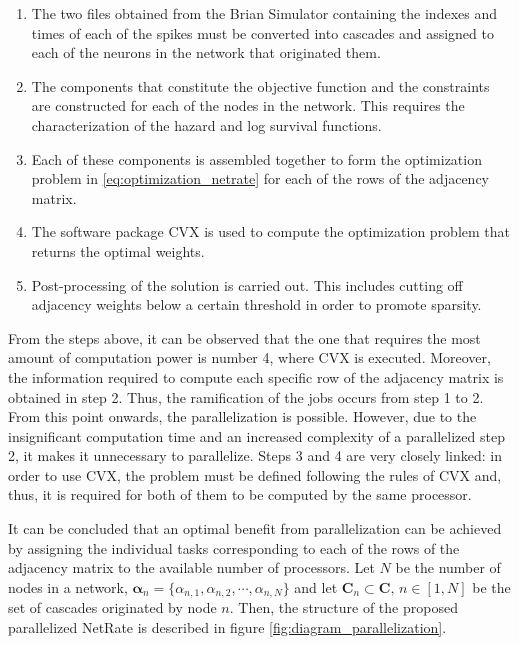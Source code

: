 \documentclass[11pt]{article}
\begin{document}
\begin{enumerate}
\item The two files obtained from the Brian Simulator containing the indexes and times of each of the spikes must be converted into cascades and assigned to each of the neurons in the network that originated them.
\item The components that constitute the objective function and the constraints are constructed for each of the nodes in the network. This requires the characterization of the hazard and log survival functions.
\item Each of these components is assembled together to form the optimization problem in \ref{eq:optimization_netrate} for each of the rows of the adjacency matrix.
\item The software package CVX is used to compute the optimization problem that returns the optimal weights.
\item Post-processing of the solution is carried out. This includes cutting off adjacency weights below a certain threshold in order to promote sparsity.
\end{enumerate}

From the steps above, it can be observed that the one that requires the most amount of computation power is number 4, where CVX is executed. Moreover, the information required to compute each specific row of the adjacency matrix is obtained in step 2. Thus, the ramification of the jobs occurs from step 1 to 2. From this point onwards, the parallelization is possible. However, due to the insignificant computation time and an increased complexity of a parallelized step 2, it makes it unnecessary to parallelize. 
Steps 3 and 4 are very closely linked: in order to use CVX, the problem must be defined following the rules of CVX and, thus, it is required for both of them to be computed by the same processor.

It can be concluded that an optimal benefit from parallelization can be achieved by assigning the individual tasks corresponding to each of the rows of the adjacency matrix to the available number of processors. Let \(N\) be the number of nodes in a network, \(\bm{\alpha}_{n} = \{\alpha_{n,1},\alpha_{n,2},\cdots,\alpha_{n,N}\}\) and let \(\bm{C}_{n} \subset \bm{C}\text{, } n \in [1,N]\) be the set of cascades originated by node \(n\). Then, the structure of the proposed parallelized NetRate is described in figure \ref{fig:diagram_parallelization}.
\end{document}
